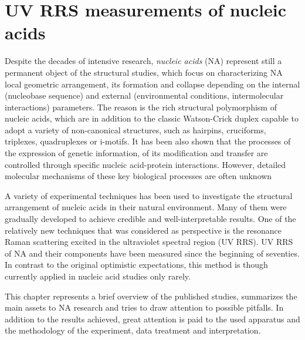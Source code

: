 \chapter{UV RRS measurements of nucleic acids}

Despite the decades of intensive research, \emph{nucleic acids} (NA) represent
still a permanent object of the structural studies, which focus on
characterizing NA local geometric arrangement, its formation and collapse
depending on the internal (nucleobase sequence) and external (environmental
conditions, intermolecular interactions) parameters.
The reason is the rich structural polymorphism of nucleic acids, which are in
addition to the classic Watson-Crick duplex capable to adopt a variety of
non-canonical structures, such as hairpins, cruciforms, triplexes, quadruplexes
or i-motifs.
It has been also shown that the processes of the expression of genetic
information, of its modification and transfer are controlled through specific
nucleic acid-protein interactions.
However, detailed molecular mechanisms of these key biological processes are
often unknown
\parencite{%
	Bansal2014,%
	Kaushik2016,%
	Yamamoto2021%
}

A variety of experimental techniques has been used to investigate the
structural arrangement of nucleic acids in their natural environment.
Many of them were gradually developed to achieve credible and
well-interpretable results.
One of the relatively new techniques that was considered as perspective is the
resonance Raman scattering excited in the ultraviolet spectral region (UV RRS).
UV RRS of NA and their components have been measured since the beginning of
seventies.
In contrast to the original optimistic expectations, this method is though
currently applied in nucleic acid studies only rarely.

This chapter represents a brief overview of the published studies, summarizes
the main assets to NA research and tries to draw attention to possible
pitfalls.
In addition to the results achieved, great attention is paid to the used
apparatus and the methodology of the experiment, data treatment and
interpretation.





